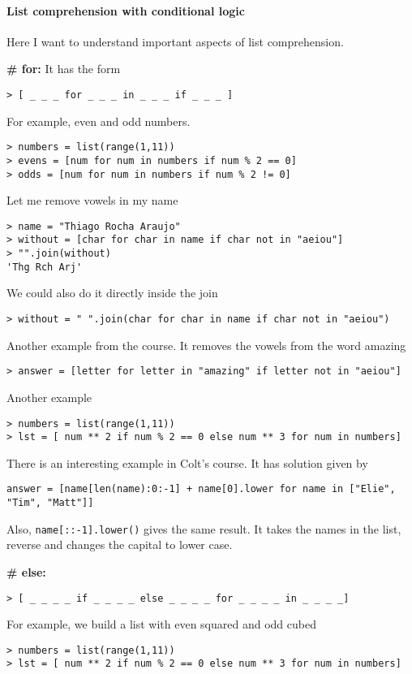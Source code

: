 \paragraph{List comprehension with conditional logic} Here I want to understand important aspects of list comprehension.

{\bf \# for:} It has the form 
\begin{verbatim}
> [ _ _ _ for _ _ _ in _ _ _ if _ _ _ ]
\end{verbatim}
For example, even and odd numbers.
\begin{verbatim}
> numbers = list(range(1,11))
> evens = [num for num in numbers if num % 2 == 0]
> odds = [num for num in numbers if num % 2 != 0]
\end{verbatim}

Let me remove vowels in my name
\begin{verbatim}
> name = "Thiago Rocha Araujo"
> without = [char for char in name if char not in "aeiou"]
> "".join(without)
'Thg Rch Arj'
\end{verbatim}

We could also do it directly inside the join
\begin{verbatim}
> without = " ".join(char for char in name if char not in "aeiou")
\end{verbatim}

Another example from the course. It removes the vowels from the word amazing
\begin{verbatim}
> answer = [letter for letter in "amazing" if letter not in "aeiou"]
\end{verbatim}

Another example
\begin{verbatim}
> numbers = list(range(1,11))
> lst = [ num ** 2 if num % 2 == 0 else num ** 3 for num in numbers]
\end{verbatim}

There is an interesting example in Colt's course. It has solution given by 
\begin{verbatim}
answer = [name[len(name):0:-1] + name[0].lower for name in ["Elie", "Tim", "Matt"]]
\end{verbatim}
Also, \verb|name[::-1].lower()| gives the same result. It takes the names in the list, reverse and changes the capital to lower case. 

{\bf \# else:}

\begin{verbatim}
> [ _ _ _ _ if _ _ _ _ else _ _ _ _ for _ _ _ _ in _ _ _ _]
\end{verbatim}        
For example, we build a list with even squared and odd cubed
\begin{verbatim}
> numbers = list(range(1,11))
> lst = [ num ** 2 if num % 2 == 0 else num ** 3 for num in numbers]
\end{verbatim}

